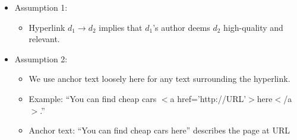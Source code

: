 \documentclass[a4paper,landscape,headrule,footrule,xetex]{foils}
\begin{document}





\begin{center}
\usetikzlibrary{positioning, shapes.geometric}
\end{center}

\begin{itemize}
\item {Assumption 1: }
\begin{itemize}
\item {Hyperlink $d_1 \rightarrow d_2$ implies that
  $d_1$'s author deems $d_2$ high-quality and relevant.}
\end{itemize}
\item {Assumption 2:  }
\begin{itemize}
\item {We use anchor text loosely here for any text surrounding the hyperlink. }
\item {Example: ``You can find cheap
  cars $<$a href='http://URL'$>$here$<$/a$>$.''}
\item {Anchor text: ``You can find cheap
  cars here''} describes the page at URL
\end{itemize}
\end{itemize}
\end{document}

